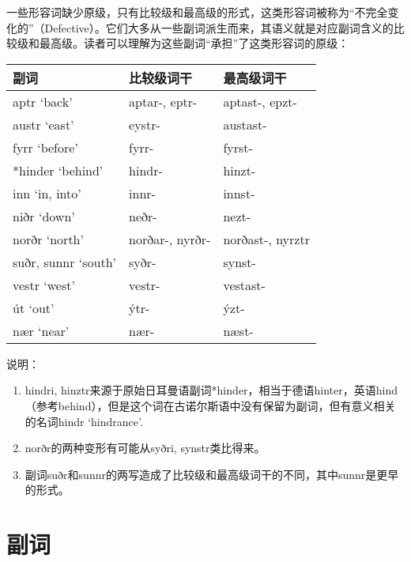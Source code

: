 一些形容词缺少原级，只有比较级和最高级的形式，这类形容词被称为``不完全变化的''（Defective）。它们大多从一些副词派生而来，其语义就是对应副词含义的比较级和最高级。读者可以理解为这些副词``承担''了这类形容词的原级：

\begin{longtable}{lll}
  \toprule
  副词                  & 比较级词干           & 最高级词干            \\
  \midrule
  \endhead
  \bottomrule
  \endfoot
  aptr `back'         & aptar-, eptr-   & aptast-, epzt-   \\
  austr `east‌'        & eystr-          & austast-         \\
  fyrr `before‌'       & fyrr-           & fyrst-           \\
  *hinder `behind'    & hindr-          & hinzt-           \\
  inn `in, into‌'      & innr-           & innst-           \\
  niðr `down'         & neðr-           & nezt-            \\
  norðr `north‌'       & norðar-, nyrðr- & norðast-, nyrztr \\
  suðr, sunnr `south' & syðr-           & synst-           \\
  vestr `west'        & vestr-          & vestast-         \\
  út `out'            & ýtr-            & ýzt-             \\
  nær `near'          & nær-            & næst-            \\
\end{longtable}

说明：

\begin{enumerate}
  \def\labelenumi{\arabic{enumi})}
  \item
        hindri,
        hinztr来源于原始日耳曼语副词*hinder，相当于德语hinter，英语hind（参考behind），但是这个词在古诺尔斯语中没有保留为副词，但有意义相关的名词hindr
        `hindrance'.
  \item
        norðr的两种变形有可能从syðri, synstr类比得来。
  \item
        副词suðr和sunnr的两写造成了比较级和最高级词干的不同，其中sunnr是更早的形式。
\end{enumerate}

\section{副词}\label{副词}

